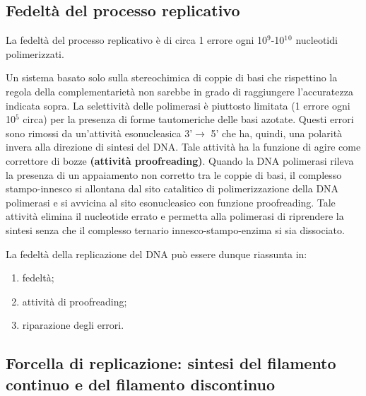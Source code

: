 \documentclass[11pt]{book}
\begin{document}
\subsection{Fedeltà del processo
replicativo}\label{fedeltuxe0-del-processo-replicativo}

La fedeltà del processo replicativo è di circa 1 errore ogni
10\(^9\)-10\(^1\)\(^0\) nucleotidi polimerizzati.

Un sistema basato solo sulla stereochimica di coppie di basi che
rispettino la regola della complementarietà non sarebbe in grado di
raggiungere l'accuratezza indicata sopra. La selettività delle
polimerasi è piuttosto limitata (1 errore ogni 10\(^5\) circa) per la
presenza di forme tautomeriche delle basi azotate. Questi errori sono
rimossi da un'attività esonucleasica 3'\(\rightarrow\) 5' che ha,
quindi, una polarità invera alla direzione di sintesi del DNA. Tale
attività ha la funzione di agire come correttore di bozze
\textbf{(attività proofreading)}. Quando la DNA polimerasi rileva la
presenza di un appaiamento non corretto tra le coppie di basi, il
complesso stampo-innesco si allontana dal sito catalitico di
polimerizzazione della DNA polimerasi e si avvicina al sito
esonucleasico con funzione proofreading. Tale attività elimina il
nucleotide errato e permetta alla polimerasi di riprendere la sintesi
senza che il complesso ternario innesco-stampo-enzima si sia dissociato.

La fedeltà della replicazione del DNA può essere dunque riassunta in:

\begin{enumerate}
\def\labelenumi{\arabic{enumi}.}
\itemsep1pt\parskip0pt
\item
  fedeltà;
\item
  attività di proofreading;
\item
  riparazione degli errori.
\end{enumerate}

\subsection{Forcella di replicazione: sintesi del filamento continuo e
del filamento
discontinuo}\label{forcella-di-replicazione-sintesi-del-filamento-continuo-e-del-filamento-discontinuo}
\end{document}
